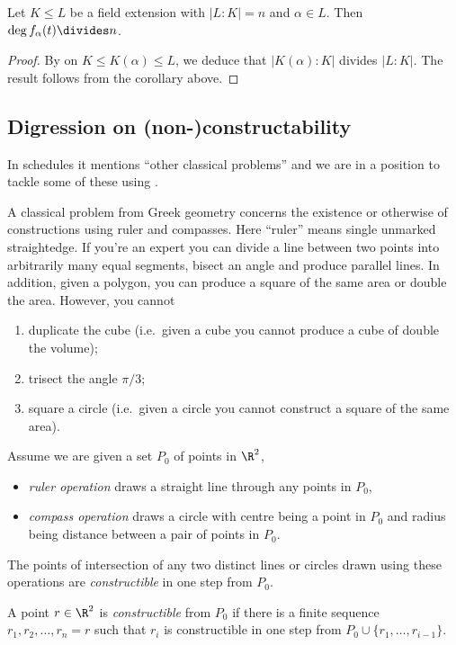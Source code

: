 \documentclass[a4paper]{article}
\begin{document}
\begin{corollary}
  \label{cor:divisibility of extension}
  Let \(K \leq L\) be a field extension with \(|L:K| = n\) and \(\alpha \in L\). Then \(\deg f_\alpha(t) \divides n\).
\end{corollary}

\begin{proof}
  By  on \(K \leq K(\alpha) \leq L\), we deduce that \(|K(\alpha):K|\) divides \(|L:K|\). The result follows from the corollary above.
\end{proof}

\subsection{Digression on (non-)constructability}

In schedules it mentions ``other classical problems'' and we are in a position to tackle some of these using .

A classical problem from Greek geometry concerns the existence or otherwise of constructions using ruler and compasses. Here ``ruler'' means single unmarked straightedge. If you're an expert you can divide a line between two points into arbitrarily many equal segments, bisect an angle and produce parallel lines. In addition, given a polygon, you can produce a square of the same area or double the area. However, you cannot
\begin{enumerate}
\item duplicate the cube (i.e.\ given a cube you cannot produce a cube of double the volume);
\item trisect the angle \(\pi/3\);
\item square a circle (i.e.\ given a circle you cannot construct a square of the same area).
\end{enumerate}

Assume we are given a set \(P_0\) of points in \(\R^2\),
\begin{itemize}
\item \emph{ruler operation} draws a straight line through any points in \(P_0\),
\item \emph{compass operation} draws a circle with centre being a point in \(P_0\) and radius being distance between a pair of points in \(P_0\).
\end{itemize}

\begin{definition}
  The points of intersection of any two distinct lines or circles drawn using these operations are \emph{constructible} in one step from \(P_0\).

  A point \(r \in \R^2\) is \emph{constructible} from \(P_0\) if there is a finite sequence \(r_1, r_2, \dots, r_n = r\) such that \(r_i\) is constructible in one step from \(P_0 \cup \{r_1, \dots, r_{i - 1}\}\).
\end{definition}
\end{document}
